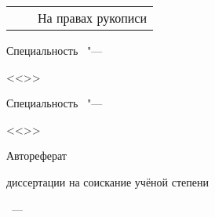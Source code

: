 \thispagestyle{empty}

\noindent%
\begin{tabularx}{\textwidth}{@{}lXr@{}}%
    & & \large{На правах рукописи}\\
\end{tabularx}

\vspace{0pt plus1fill} %
\begin{center}
\textbf {\large \thesisAuthor}
\end{center}

\vspace{0pt plus3fill} %
\begin{center}
\textbf {\Large %
\thesisTitle}

\vspace{0pt plus3fill} %
{\large Специальность \thesisSpecialtyNumber\ "---\par <<\thesisSpecialtyTitle>>}

\ifdefined\thesisSpecialtyTwoNumber
{\large Специальность \thesisSpecialtyTwoNumber\ "---\par <<\thesisSpecialtyTwoTitle>>}
\fi

\vspace{0pt plus1.5fill} %
\Large{Автореферат}\par
\large{диссертации на соискание учёной степени\par \thesisDegree}
\end{center}

\vspace{0pt plus4fill} %
{\centering\thesisCity~--- \thesisYear\par}

\newpage


